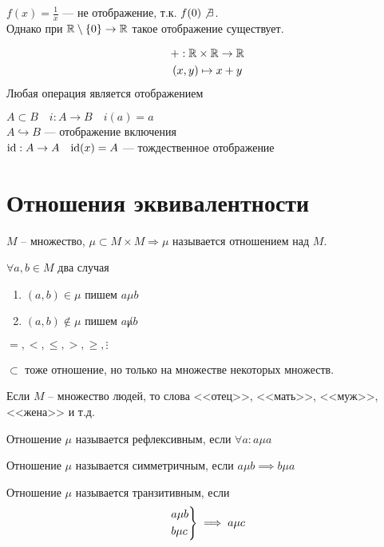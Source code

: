 \documentclass[main]{subfiles}
\begin{document}
\begin{example}
    $f(x) = \frac{1}{x}$ --- не отображение, т.к. $f(0) \not\exists$.\\
    Однако при $\mathbb{R} \setminus \{0\} \to \mathbb{R}$ такое отображение существует.
\end{example}
\begin{example}
    \begin{gather*}
        +:\mathbb{R} \times \mathbb{R}  \to \mathbb{R} \\
        (x,y)           \mapsto x+ y
    \end{gather*}
    Любая операция является отображением
\end{example}
\begin{example}
    $A \subset B \quad i:A\to B \quad i(a)=a$\\
    $ A \hookrightarrow B$ --- отображение включения\\
    $\mathrm{id}:A \to A \quad  \mathrm{id}(x)=A$ --- тождественное отображение
\end{example}


\section{Отношения эквивалентности}
\begin{definition}
    $M$ -- множество, $\mu \subset M \times M \Rightarrow \mu$ называется
    отношением над $M$.

    $\forall a,b \in M$ два случая
    \begin{enumerate}
        \item $(a,b) \in \mu$ пишем $a \mu b$
        \item $(a,b) \not\in \mu$ пишем $a \not\mu b$
    \end{enumerate}
\end{definition}
\begin{example}
    $=, <,\le , >, \ge, \vdots$

    $\subset$ тоже отношение, но только на множестве некоторых множеств.

    Если $M$ -- множество людей, то слова <<отец>>, <<мать>>, <<муж>>, <<жена>> и т.д.
\end{example}

\begin{definition}
    Отношение $\mu$ называется рефлексивным, если $\forall a: a\mu a$
\end{definition}
\begin{definition}
    Отношение $\mu$ называется симметричным, если $a \mu b \implies b \mu a$
\end{definition}
\begin{definition}
    Отношение $\mu$ называется транзитивным, если \[\begin{rcases}
            a \mu b \\
            b \mu c
        \end{rcases}\implies a\mu c\]
\end{definition}
\end{document}
